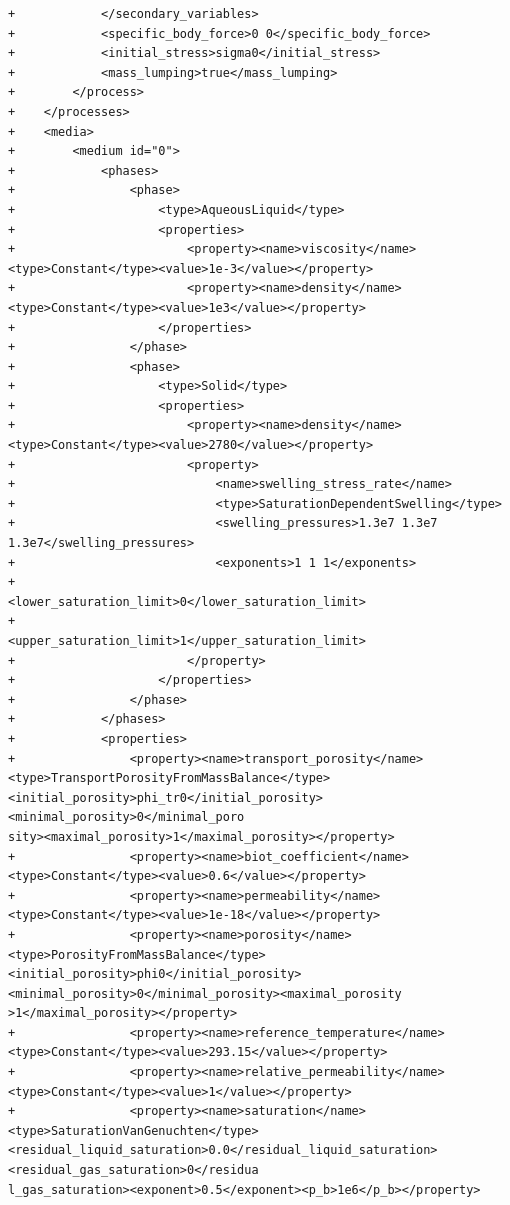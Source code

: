 \documentclass[10pt]{article}
\begin{document}
\begin{lstlisting}
+            </secondary_variables>
+            <specific_body_force>0 0</specific_body_force>
+            <initial_stress>sigma0</initial_stress>
+            <mass_lumping>true</mass_lumping>
+        </process>
+    </processes>
+    <media>
+        <medium id="0">
+            <phases>
+                <phase>
+                    <type>AqueousLiquid</type>
+                    <properties>
+                        <property><name>viscosity</name><type>Constant</type><value>1e-3</value></property>
+                        <property><name>density</name><type>Constant</type><value>1e3</value></property>
+                    </properties>
+                </phase>
+                <phase>
+                    <type>Solid</type>
+                    <properties>
+                        <property><name>density</name><type>Constant</type><value>2780</value></property>
+                        <property>
+                            <name>swelling_stress_rate</name>
+                            <type>SaturationDependentSwelling</type>
+                            <swelling_pressures>1.3e7 1.3e7 1.3e7</swelling_pressures>
+                            <exponents>1 1 1</exponents>
+                            <lower_saturation_limit>0</lower_saturation_limit>
+                            <upper_saturation_limit>1</upper_saturation_limit>
+                        </property>
+                    </properties>
+                </phase>
+            </phases>
+            <properties>
+                <property><name>transport_porosity</name><type>TransportPorosityFromMassBalance</type><initial_porosity>phi_tr0</initial_porosity><minimal_porosity>0</minimal_poro
sity><maximal_porosity>1</maximal_porosity></property>
+                <property><name>biot_coefficient</name><type>Constant</type><value>0.6</value></property>
+                <property><name>permeability</name><type>Constant</type><value>1e-18</value></property>
+                <property><name>porosity</name><type>PorosityFromMassBalance</type><initial_porosity>phi0</initial_porosity><minimal_porosity>0</minimal_porosity><maximal_porosity
>1</maximal_porosity></property>
+                <property><name>reference_temperature</name><type>Constant</type><value>293.15</value></property>
+                <property><name>relative_permeability</name><type>Constant</type><value>1</value></property>
+                <property><name>saturation</name><type>SaturationVanGenuchten</type><residual_liquid_saturation>0.0</residual_liquid_saturation><residual_gas_saturation>0</residua
l_gas_saturation><exponent>0.5</exponent><p_b>1e6</p_b></property>

\end{lstlisting}
\end{document}
